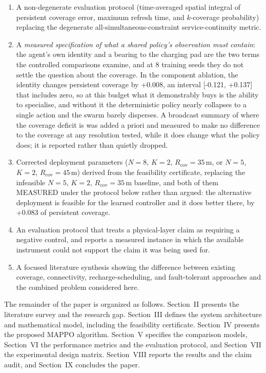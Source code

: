 \documentclass[conference]{IEEEtran}
\newcommand{\tokAltVerdictShort}{the alternative deployment is feasible for the learned controller and it does better there, by +0.083 of persistent coverage}
\begin{document}
\begin{enumerate}
    \item A non-degenerate evaluation protocol (time-averaged spatial integral of persistent coverage error, maximum refresh time, and $k$-coverage probability) replacing the degenerate all-simultaneous-constraint service-continuity metric.
    \item A \emph{measured specification of what a shared policy's observation must contain}: the agent's own identity and a bearing to the charging pad are the two terms the controlled comparisons examine, and at 8 training seeds they do not settle the question about the coverage.  In the component ablation, the identity changes persistent coverage by +0.008, an interval [-0.121, +0.137] that includes zero, so at this budget what it demonstrably buys is the ability to specialise, and without it the deterministic policy nearly collapses to a single action and the swarm barely disperses.  A broadcast summary of where the coverage deficit is was added a priori and measured to make no difference to the coverage at any resolution tested, while it does change what the policy does; it is reported rather than quietly dropped.
    \item Corrected deployment parameters ($N=8$, $K=2$, $R_{\mathrm{cov}}=35\,\mathrm{m}$, or $N=5$, $K=2$, $R_{\mathrm{cov}}=45\,\mathrm{m}$) derived from the feasibility certificate, replacing the infeasible $N=5$, $K=2$, $R_{\mathrm{cov}}=35\,\mathrm{m}$ baseline, and both of them MEASURED under the protocol below rather than argued: \tokAltVerdictShort.
    \item An evaluation protocol that treats a physical-layer claim as requiring a negative control, and reports a measured instance in which the available instrument could not support the claim it was being used for.
    \item A focused literature synthesis showing the difference between existing coverage, connectivity, recharge-scheduling, and fault-tolerant approaches and the combined problem considered here.
\end{enumerate}

The remainder of the paper is organized as follows. Section~II presents the literature survey and the research gap. Section~III defines the system architecture and mathematical model, including the feasibility certificate. Section~IV presents the proposed MAPPO algorithm. Section~V specifies the comparison models, Section~VI the performance metrics and the evaluation protocol, and Section~VII the experimental design matrix. Section~VIII reports the results and the claim audit, and Section~IX concludes the paper.
\end{document}
